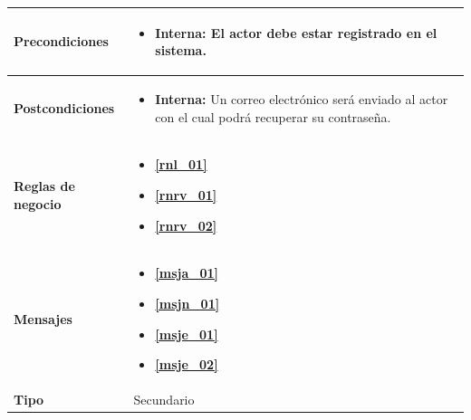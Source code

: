 \begin{center}
\begin{longtable}{| p{3.5cm} | p{11.5cm} |}
        \hline	
          \textbf{Precondiciones}& 
            \begin{itemize}
              \item \textbf{Interna:} El actor debe estar registrado en el sistema.
            \end{itemize} \\
        \hline	
          \textbf{Postcondiciones} & 
            \begin{itemize}
              \item \textbf{Interna:} Un correo electrónico será enviado al actor con el cual podrá recuperar su contraseña.
            \end{itemize} \\
       \hline    
          \textbf{Reglas de negocio} & 
          \begin{itemize}
         	  \item \textbf{\ref{rnl_01}}
         	  \item \textbf{\ref{rnrv_01}}
         	  \item \textbf{\ref{rnrv_02}}
	 \end{itemize} \\
       \hline
          \textbf{Mensajes} & 
         	\begin{itemize}
         	  \item \textbf{\ref{msja_01}}
         	  \item \textbf{\ref{msjn_01}}
         	  \item \textbf{\ref{msje_01}}
         	  \item \textbf{\ref{msje_02}}
	 \end{itemize} \\
       \hline
          \textbf{Tipo} & Secundario \\
       \hline	    
  \end{longtable}
\end{center}
\endgroup

